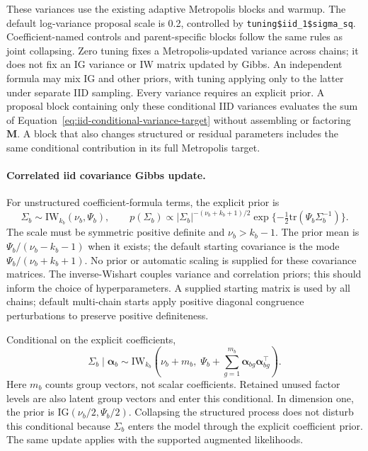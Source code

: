 \documentclass[11pt]{article}
\newcommand{\balpha}{\bm{\alpha}}
\newcommand{\bM}{\bm{M}}
\newcommand{\trans}{^\top}
\begin{document}
These variances use the existing adaptive Metropolis blocks and warmup. The
default log-variance proposal scale is 0.2, controlled by
\texttt{tuning\$iid\_1\$sigma\_sq}. Coefficient-named controls and parent-specific
blocks follow the same rules as joint collapsing. Zero tuning fixes a
Metropolis-updated variance across chains; it does not fix an IG variance or IW
matrix updated by Gibbs. An independent formula may mix IG and other priors,
with tuning applying only to the latter under separate IID sampling. Every
variance requires an explicit prior. A proposal block containing only these
conditional IID variances evaluates the sum of Equation~\eqref{eq:iid-conditional-variance-target}
without assembling or factoring $\bM$. A block that also changes structured
or residual parameters includes the same conditional contribution in its full
Metropolis target.

\paragraph{Correlated iid covariance Gibbs update.}
For unstructured coefficient-formula terms, the explicit prior is
\begin{equation}
 \Sigma_b\sim\mathrm{IW}_{k_b}(\nu_b,\Psi_b),\qquad
 p(\Sigma_b)\propto |\Sigma_b|^{-(\nu_b+k_b+1)/2}
 \exp\{-\tfrac12\mathrm{tr}(\Psi_b\Sigma_b^{-1})\}.
\end{equation}
The scale must be symmetric positive definite and $\nu_b>k_b-1$. The prior mean is $\Psi_b/(\nu_b-k_b-1)$ when it exists; the default starting covariance is the mode $\Psi_b/(\nu_b+k_b+1)$. No prior or automatic scaling is supplied for these covariance matrices. The inverse-Wishart couples variance and correlation priors; this should inform the choice of hyperparameters. A supplied starting matrix is used by all chains; default multi-chain starts apply positive diagonal congruence perturbations to preserve positive definiteness.

Conditional on the explicit coefficients,
\begin{equation}
 \Sigma_b\mid\balpha_b\sim\mathrm{IW}_{k_b}\left(
 \nu_b+m_b,\;\Psi_b+\sum_{g=1}^{m_b}\balpha_{bg}\balpha_{bg}\trans\right).
\end{equation}
Here $m_b$ counts group vectors, not scalar coefficients. Retained unused factor levels are also latent group vectors and enter this conditional. In dimension one, the prior is $\mathrm{IG}(\nu_b/2,\Psi_b/2)$. Collapsing the structured process does not disturb this conditional because $\Sigma_b$ enters the model through the explicit coefficient prior. The same update applies with the supported augmented likelihoods.
\end{document}
